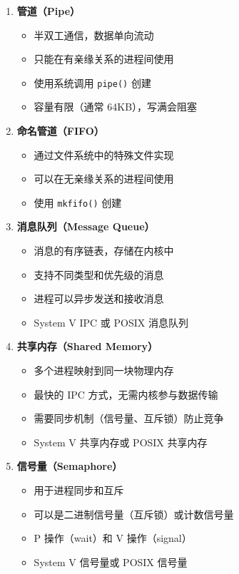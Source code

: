 \begin{enumerate}
  \item \textbf{管道（Pipe）}
    \begin{itemize}
      \item 半双工通信，数据单向流动
      \item 只能在有亲缘关系的进程间使用
      \item 使用系统调用 \texttt{pipe()} 创建
      \item 容量有限（通常 64KB），写满会阻塞
    \end{itemize}

  \item \textbf{命名管道（FIFO）}
    \begin{itemize}
      \item 通过文件系统中的特殊文件实现
      \item 可以在无亲缘关系的进程间使用
      \item 使用 \texttt{mkfifo()} 创建
    \end{itemize}

  \item \textbf{消息队列（Message Queue）}
    \begin{itemize}
      \item 消息的有序链表，存储在内核中
      \item 支持不同类型和优先级的消息
      \item 进程可以异步发送和接收消息
      \item System V IPC 或 POSIX 消息队列
    \end{itemize}

  \item \textbf{共享内存（Shared Memory）}
    \begin{itemize}
      \item 多个进程映射到同一块物理内存
      \item 最快的 IPC 方式，无需内核参与数据传输
      \item 需要同步机制（信号量、互斥锁）防止竞争
      \item System V 共享内存或 POSIX 共享内存
    \end{itemize}

  \item \textbf{信号量（Semaphore）}
    \begin{itemize}
      \item 用于进程同步和互斥
      \item 可以是二进制信号量（互斥锁）或计数信号量
      \item P 操作（wait）和 V 操作（signal）
      \item System V 信号量或 POSIX 信号量
    \end{itemize}


\end{enumerate}
